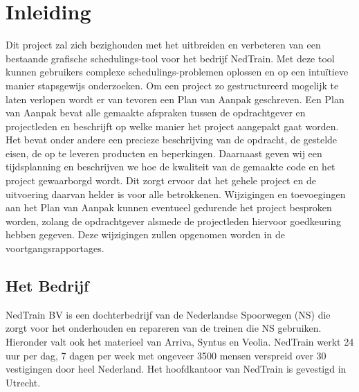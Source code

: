 \section{Inleiding}
Dit project zal zich bezighouden met het uitbreiden en verbeteren van een bestaande grafische schedulings-tool voor het bedrijf NedTrain. Met deze tool kunnen gebruikers complexe schedulings-problemen oplossen en op een intu\"itieve manier stapsgewijs onderzoeken. Om een project zo gestructureerd mogelijk te laten verlopen wordt er van tevoren een Plan van Aanpak geschreven. Een Plan van Aanpak bevat alle gemaakte afspraken tussen de opdrachtgever en projectleden en beschrijft op welke manier het project aangepakt gaat worden. Het bevat onder andere een precieze beschrijving van de opdracht, de gestelde eisen, de op te leveren producten en beperkingen. Daarnaast geven wij een tijdsplanning en beschrijven we hoe de kwaliteit van de gemaakte code en het project gewaarborgd wordt. Dit zorgt ervoor dat het gehele project en de uitvoering daarvan helder is voor alle betrokkenen. Wijzigingen en toevoegingen aan het Plan van Aanpak kunnen eventueel gedurende het project besproken worden, zolang de opdrachtgever alsmede de projectleden hiervoor goedkeuring hebben gegeven. Deze wijzigingen zullen opgenomen worden in de voortgangsrapportages.

\subsection{Het Bedrijf}
NedTrain BV is een dochterbedrijf van de Nederlandse Spoorwegen (NS) die zorgt voor het onderhouden en repareren van de treinen die NS gebruiken. Hieronder valt ook het materieel van Arriva, Syntus en Veolia. NedTrain werkt 24 uur per dag, 7 dagen per week met ongeveer 3500 mensen verspreid over 30 vestigingen door heel Nederland. Het hoofdkantoor van NedTrain is gevestigd in Utrecht. 

